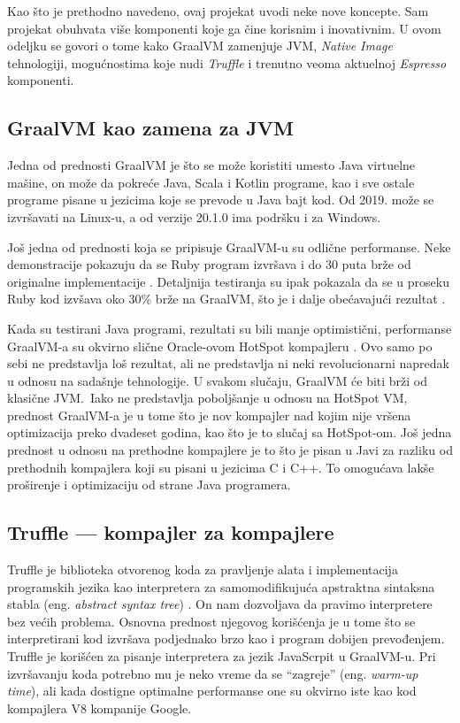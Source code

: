 \documentclass[a4paper]{article}
\begin{document}
Kao što je prethodno navedeno, ovaj projekat uvodi neke nove koncepte. Sam projekat obuhvata više komponenti koje ga čine korisnim i inovativnim. U ovom odeljku se govori o tome kako GraalVM zamenjuje JVM, \emph{Native Image} tehnologiji, mogućnostima koje nudi \emph{Truffle} i trenutno veoma aktuelnoj \emph{Espresso} komponenti.

\subsection{GraalVM kao zamena za JVM}
\label{sub:GraalVMJVM}

Jedna od prednosti GraalVM je što se može koristiti umesto Java virtuelne mašine, on može da pokreće Java, Scala i Kotlin programe, kao i sve ostale programe pisane u jezicima koje se prevode u Java bajt kod. Od 2019. može se izvršavati na Linux-u, a od verzije 20.1.0 ima podršku i za Windows.

Još jedna od prednosti koja se pripisuje GraalVM-u su odlične performanse. Neke demonstracije pokazuju da se Ruby program izvršava i do 30 puta brže od originalne implementacije \cite{graalvmbenchmark}. Detaljnija testiranja su ipak pokazala da se u proseku Ruby kod izvšava oko 30\% brže na GraalVM, što je i dalje obećavajući rezultat \cite{whataboutgraalvm}.

Kada su testirani Java programi, rezultati su bili manje optimistični, performanse GraalVM-a su okvirno slične Oracle-ovom HotSpot kompajleru \cite{graalvm}. Ovo samo po sebi ne predstavlja loš rezultat, ali ne predstavlja ni neki revolucionarni napredak u odnosu na sadašnje tehnologije. U svakom slučaju, GraalVM će biti brži od klasične JVM.\ Iako ne predstavlja poboljšanje u odnosu na HotSpot VM, prednost GraalVM-a je u tome što je nov kompajler nad kojim nije vršena optimizacija preko dvadeset godina, kao što je to slučaj sa HotSpot-om. Još jedna prednost u odnosu na prethodne kompajlere je to što je pisan u Javi za razliku od prethodnih kompajlera koji su pisani u jezicima C i C++. To omogućava lakše proširenje i optimizaciju od strane Java programera.

\subsection{Truffle --- kompajler za kompajlere}
\label{sub:truffle}

Truffle je biblioteka otvorenog koda za pravljenje alata i implementacija programskih jezika kao interpretera za samomodifikujuća apstraktna sintaksna stabla (eng. \emph{abstract syntax tree}) \cite{graalvm}. On nam dozvoljava da pravimo interpretere bez većih problema. Osnovna prednost njegovog korišćenja je u tome što se interpretirani kod izvršava podjednako brzo kao i program dobijen prevođenjem. Truffle je korišćen za pisanje interpretera za jezik JavaScrpit u GraalVM-u. Pri izvršavanju koda potrebno mu je neko vreme da se ``zagreje'' (eng. \emph{warm-up time}), ali kada dostigne optimalne performanse one su okvirno iste kao kod kompajlera V8 kompanije Google.
\end{document}
